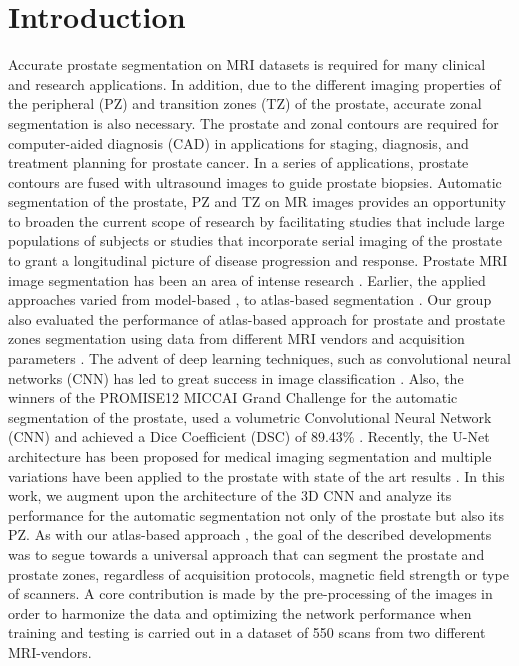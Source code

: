 \section{Introduction}
\label{sec:intro}
Accurate prostate segmentation on MRI datasets is required for many clinical and research applications. In addition, due to the different imaging properties of the peripheral (PZ) and transition zones (TZ) of the prostate, accurate zonal segmentation is also necessary. The prostate and zonal contours are required for computer-aided diagnosis (CAD) in applications for staging, diagnosis, and treatment planning for prostate cancer. In a series of applications, prostate contours are fused with ultrasound images to guide prostate biopsies. Automatic segmentation of the prostate, PZ and TZ on MR images provides an opportunity to broaden the current scope of research by facilitating studies that include large populations of subjects or studies that incorporate serial imaging of the prostate to grant a longitudinal picture of disease progression and response.  Prostate MRI image segmentation has been an area of intense research \cite{litjens2014evaluation}. Earlier, the applied approaches varied from model-based \cite{chowdhury2012concurrent,toth2012multifeature}, to atlas-based segmentation \cite{4_klein2008automatic,5_cheng2014atlas,6_xie2014low,7_tian2015fully,8_korsager2015use,9_chilali2016gland}.  Our group also evaluated the performance of atlas-based approach for prostate and prostate zones segmentation using data from different MRI vendors and acquisition parameters \cite{10_padgett2018towards}. The advent of deep learning techniques, such as convolutional neural networks (CNN) has led to great success in image classification \cite{11_krizhevsky2012imagenet,12_simonyan2011immediate}.  Also, the winners of the PROMISE12 MICCAI Grand Challenge \cite{litjens2014evaluation} for the automatic segmentation of the prostate,  used a volumetric Convolutional Neural Network (CNN) and achieved a Dice Coefficient (DSC) of 89.43\% \cite{yu2017volumetric}.  Recently, the U-Net architecture has been proposed \cite{13_ronneberger2015u} for medical imaging segmentation and multiple variations have been applied to the prostate with state of the art results \cite{anneke}. In this work, we augment upon the architecture of the 3D CNN and analyze its performance for the automatic segmentation not only of the  prostate but also its PZ. As with our atlas-based approach \cite{10_padgett2018towards}, the goal of the described developments was to segue towards a universal approach that can segment the prostate and prostate zones, regardless of acquisition protocols, magnetic field strength or type of scanners. A core contribution is made by the pre-processing of the images in order to harmonize the data and optimizing the network performance when training and testing is carried out in a dataset of 550 scans from two different MRI-vendors. 
